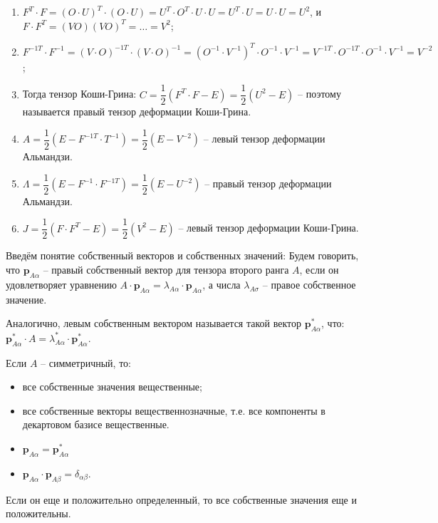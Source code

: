 \begin{corollary}
  \begin{enumerate}
    \item $F^T \cdot F = (O\cdot U)^T \cdot (O \cdot U) = U^T \cdot O^T \cdot U \cdot U = U^T \cdot U= U \cdot U = U^2$, и $F \cdot F^T = (V O) (V O)^T = \dots = V^2$;

    \item $F^{-1T} \cdot F^{-1} = (V \cdot O)^{-1T} \cdot (V \cdot O)^{-1}
      = (O^{-1} \cdot V^{-1})^T \cdot O^{-1} \cdot V^{-1}
      = V^{-1T} \cdot O^{-1T} \cdot O^{-1} \cdot V^{-1}
      = V^{-2}$;

    \item Тогда тензор Коши-Грина: $C = \dfrac{1}{2} (F^T \cdot F - E) = \dfrac{1}{2} \left( U^2 - E \right)$ -- поэтому называется правый тензор деформации Коши-Грина.

    \item $A = \dfrac{1}{2} \left( E - F^{-1T} \cdot T^{-1} \right)  = \dfrac{1}{2} \left( E - V^{-2} \right) $ -- левый тензор деформации Альмандзи.

    \item $\Lambda = \dfrac{1}{2} (E - F^{-1} \cdot F^{-1T}) = \dfrac{1}{2} (E - U^{-2})$ --
      правый тензор деформации Альмандзи.

    \item $J = \dfrac{1}{2} \left( F \cdot F^T - E \right) = \dfrac{1}{2} (V^2 - E)$
      -- левый тензор деформации Коши-Грина.
  \end{enumerate}
\end{corollary}

\begin{definition}
  Введём понятие собственный векторов и собственных значений:
  Будем говорить, что $\mathbf{p}_{A\alpha}$ -- правый собственный вектор для тензора второго ранга $A$, если
  он удовлетворяет уравнению $A \cdot \mathbf{p}_{A\alpha} = \lambda_{A\alpha} \cdot \mathbf{p}_{A\alpha}$, а числа $\lambda_{A\sigma}$ -- правое собственное значение.

  Аналогично, левым собственным вектором называется такой вектор $\mathbf{p}^*_{A\alpha}$, что:
  $\mathbf{p}^*_{A\alpha} \cdot A = \lambda^*_{A\alpha} \cdot \mathbf{p}^*_{A\alpha}$.
\end{definition}

\begin{corollary}
  Если $A$ -- симметричный, то:
  \begin{itemize}
    \item все собственные значения вещественные;
    \item все собственные векторы вещественнозначные, т.е. все компоненты в декартовом базисе
      вещественные.
    \item $\mathbf{p}_{A\alpha} = \mathbf{p}^*_{A\alpha}$
    \item $\mathbf{p}_{A\alpha} \cdot \mathbf{p}_{A\beta} = \delta_{\alpha\beta}.$
  \end{itemize}

  Если он еще и положительно определенный, то все собственные значения еще и положительны.
\end{corollary}

